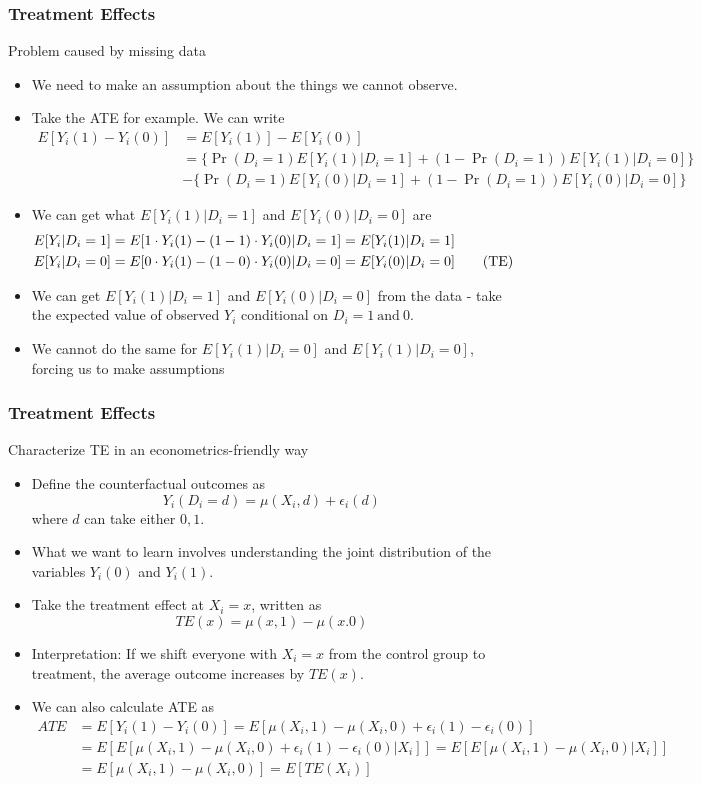 \documentclass{beamer}
\begin{document}
\begin{frame}
\frametitle{Treatment Effects}
Problem caused by missing data 
\begin{itemize}
\item  We need to make an assumption about the things we cannot observe.
\item Take the ATE for example. We can write
\footnotesize{\begin{align*}
E[Y_i(1)-Y_i(0)] & = E[Y_i(1)]-E[Y_i(0)]\\
&=\{\Pr(D_i=1)E[Y_i(1)|D_i=1]+(1-\Pr(D_i=1))E[Y_i(1)|D_i=0]\}\\
&-\{\Pr(D_i=1)E[Y_i(0)|D_i=1]+(1-\Pr(D_i=1))E[Y_i(0)|D_i=0]\}
\end{align*}}\normalsize
\item We can get what $E[Y_i(1)|D_i=1]$ and $E[Y_i(0)|D_i=0]$ are
\footnotesize{\begin{align*}
E[Y_i|D_i=1]&=E[1\cdot Y_i(1)-(1-1)\cdot Y_i(0)|D_i=1]=E[Y_i(1)|D_i=1]\\
E[Y_i|D_i=0]&=E[0\cdot Y_i(1)-(1-0)\cdot Y_i(0)|D_i=0]=E[Y_i(0)|D_i=0] \tag{\text{TE}}\label{TE}
\end{align*}}\normalsize
\item We can get $E[Y_i(1)|D_i=1]$ and $E[Y_i(0)|D_i=0]$ from the data - take the expected value of observed $Y_i$ conditional on $D_i=1 \ \text{and}\ 0$. 
\item We cannot do the same for $E[Y_i(1)|D_i=0]$ and $E[Y_i(1)|D_i=0]$, forcing us to make assumptions
\end{itemize}
\end{frame}

\begin{frame}
\frametitle{Treatment Effects}
Characterize TE in an econometrics-friendly way
\begin{itemize}
\item  Define the counterfactual outcomes as
\[
Y_i(D_i=d)=\mu(X_i,d)+\epsilon_i(d)
\]
where $d$ can take either $0, 1$. 
\item What we want to learn involves understanding the joint distribution of the variables $Y_i(0)$ and $Y_i(1)$. 
\item Take the treatment effect at $X_i=x$, written as
\[
TE(x)=\mu(x,1)-\mu(x.0)
\]
\item Interpretation: If we shift everyone with $X_i=x$ from the control group to treatment, the average outcome increases by $TE(x)$.
\item We can also calculate ATE as
\footnotesize{\begin{align*}
ATE&=E[Y_i(1)-Y_i(0)]=E[\mu(X_i,1)-\mu(X_i,0)+\epsilon_i(1)-\epsilon_i(0)]\\
&=E\left[E[\mu(X_i,1)-\mu(X_i,0)+\epsilon_i(1)-\epsilon_i(0)|X_i]\right]=E\left[E[\mu(X_i,1)-\mu(X_i,0)|X_i]\right]\\
&=E[\mu(X_i,1)-\mu(X_i,0)]=E[TE(X_i)]
\end{align*}}\normalsize
\end{itemize}
\end{frame}
\end{document}
